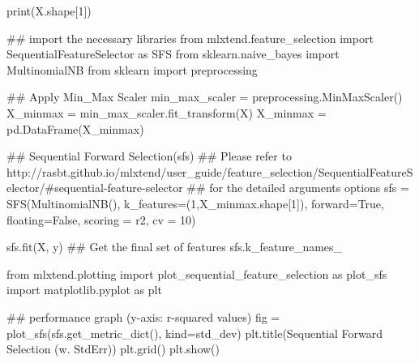 \documentclass[
  letterpaper,
]{scrbook}
\newenvironment{Shaded}{\begin{snugshade}}{\end{snugshade}}
\newcommand{\BuiltInTok}[1]{\textcolor[rgb]{0.00,0.23,0.31}{#1}}
\newcommand{\CommentTok}[1]{\textcolor[rgb]{0.37,0.37,0.37}{#1}}
\newcommand{\DecValTok}[1]{\textcolor[rgb]{0.68,0.00,0.00}{#1}}
\newcommand{\ImportTok}[1]{\textcolor[rgb]{0.00,0.46,0.62}{#1}}
\newcommand{\NormalTok}[1]{\textcolor[rgb]{0.00,0.23,0.31}{#1}}
\newcommand{\OperatorTok}[1]{\textcolor[rgb]{0.37,0.37,0.37}{#1}}
\newcommand{\StringTok}[1]{\textcolor[rgb]{0.13,0.47,0.30}{#1}}
\newcommand{\VariableTok}[1]{\textcolor[rgb]{0.07,0.07,0.07}{#1}}
\begin{document}
\begin{Shaded}
\begin{Highlighting}[]
\BuiltInTok{print}\NormalTok{(X.shape[}\DecValTok{1}\NormalTok{])}

\CommentTok{\#\# import the necessary libraries}
\ImportTok{from}\NormalTok{ mlxtend.feature\_selection }\ImportTok{import}\NormalTok{ SequentialFeatureSelector }\ImportTok{as}\NormalTok{ SFS}
\ImportTok{from}\NormalTok{ sklearn.naive\_bayes }\ImportTok{import}\NormalTok{ MultinomialNB}
\ImportTok{from}\NormalTok{ sklearn }\ImportTok{import}\NormalTok{ preprocessing}

\CommentTok{\#\# Apply Min\_Max Scaler}
\NormalTok{min\_max\_scaler }\OperatorTok{=}\NormalTok{ preprocessing.MinMaxScaler()}
\NormalTok{X\_minmax }\OperatorTok{=}\NormalTok{ min\_max\_scaler.fit\_transform(X)}
\NormalTok{X\_minmax }\OperatorTok{=}\NormalTok{ pd.DataFrame(X\_minmax)}

\CommentTok{\#\# Sequential Forward Selection(sfs)}
\CommentTok{\#\# Please refer to http://rasbt.github.io/mlxtend/user\_guide/feature\_selection/SequentialFeatureSelector/\#sequential{-}feature{-}selector}
\CommentTok{\#\# for the detailed arguments options}
\NormalTok{sfs }\OperatorTok{=}\NormalTok{ SFS(MultinomialNB(),}
\NormalTok{           k\_features}\OperatorTok{=}\NormalTok{(}\DecValTok{1}\NormalTok{,X\_minmax.shape[}\DecValTok{1}\NormalTok{]),}
\NormalTok{           forward}\OperatorTok{=}\VariableTok{True}\NormalTok{, }
\NormalTok{           floating}\OperatorTok{=}\VariableTok{False}\NormalTok{,}
\NormalTok{           scoring }\OperatorTok{=} \StringTok{\textquotesingle{}r2\textquotesingle{}}\NormalTok{,}
\NormalTok{           cv }\OperatorTok{=} \DecValTok{10}\NormalTok{)}

\NormalTok{sfs.fit(X, y)}
\CommentTok{\#\# Get the final set of features}
\NormalTok{sfs.k\_feature\_names\_     }
\end{Highlighting}
\end{Shaded}

\begin{Shaded}
\begin{Highlighting}[]
\ImportTok{from}\NormalTok{ mlxtend.plotting }\ImportTok{import}\NormalTok{ plot\_sequential\_feature\_selection }\ImportTok{as}\NormalTok{ plot\_sfs}
\ImportTok{import}\NormalTok{ matplotlib.pyplot }\ImportTok{as}\NormalTok{ plt}

\CommentTok{\#\# performance graph (y{-}axis: r{-}squared values)}
\NormalTok{fig }\OperatorTok{=}\NormalTok{ plot\_sfs(sfs.get\_metric\_dict(), kind}\OperatorTok{=}\StringTok{\textquotesingle{}std\_dev\textquotesingle{}}\NormalTok{)}
\NormalTok{plt.title(}\StringTok{\textquotesingle{}Sequential Forward Selection (w. StdErr)\textquotesingle{}}\NormalTok{)}
\NormalTok{plt.grid()}
\NormalTok{plt.show()}
\end{Highlighting}
\end{Shaded}
\end{document}
